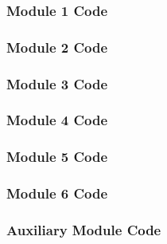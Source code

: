 \documentclass[conf]{new-aiaa} %
\begin{document}
\subsubsection{Module 1 Code}


\subsubsection{Module 2 Code}


\subsubsection{Module 3 Code}


\subsubsection{Module 4 Code}


\subsubsection{Module 5 Code}


\subsubsection{Module 6 Code}


\subsubsection{Auxiliary Module Code}




\end{document}
